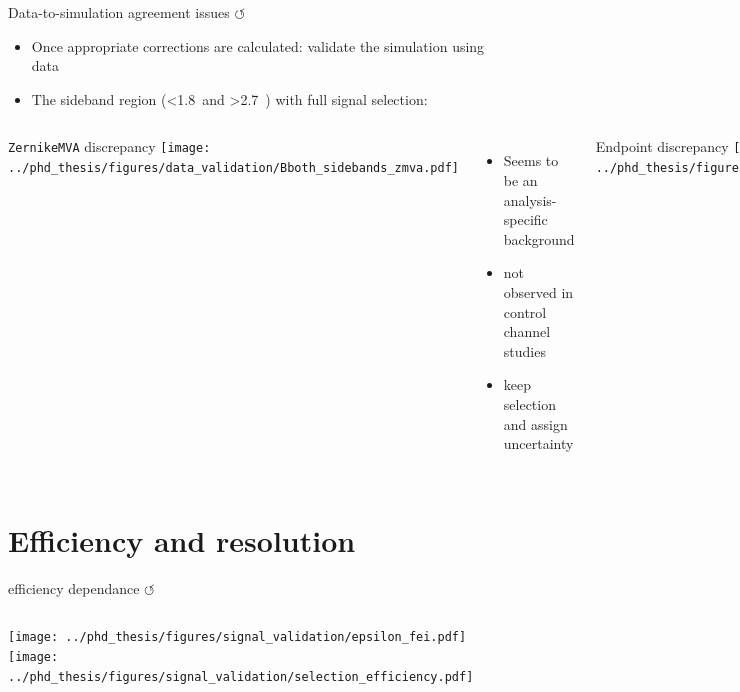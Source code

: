\documentclass[xcolor=dvipsnames]{beamer}
\begin{document}
   \begin{frame}{Data-to-simulation agreement issues \hyperlink{frame:A}{$\circlearrowleft$}}
      \scriptsize\centering
      \begin{itemize}
         \item Once appropriate corrections are calculated: validate the simulation using data
         \item The sideband region (\EB<1.8~\gev and \EB>2.7~\gev) with full signal selection:
      \end{itemize}
   
      \vspace{5pt}
   
      \begin{columns}[t]
         \centering
         \texttt{ZernikeMVA} discrepancy
         \texttt{[image: ../phd\_thesis/figures/data\_validation/Bboth\_sidebands\_zmva.pdf]}
         
         \begin{itemize}
            \item Seems to be an analysis-specific background
            \item[\ra] not observed in control channel studies
            \item[\ra] keep selection and assign uncertainty   
         \end{itemize}
         
         \centering
         \Mbc Endpoint discrepancy
         \texttt{[image: ../phd\_thesis/figures/data\_validation/sidebands\_mbc\_nozmva\_1.pdf]}
         \begin{itemize}
            \item Related to the fact that data-taking period independent simulation used
            \item[\ra] correction and uncertainty applied
         \end{itemize}
     
      \end{columns}
   
   \end{frame}
   

  \section{Efficiency and resolution}

\begin{frame}{\BtoXsgamma efficiency dependance \hyperlink{frame:A}{$\circlearrowleft$}}
   \begin{columns}
          \texttt{[image: ../phd\_thesis/figures/signal\_validation/epsilon\_fei.pdf]}
          \texttt{[image: ../phd\_thesis/figures/signal\_validation/selection\_efficiency.pdf]}
   \end{columns}
\end{frame}
\end{document}

